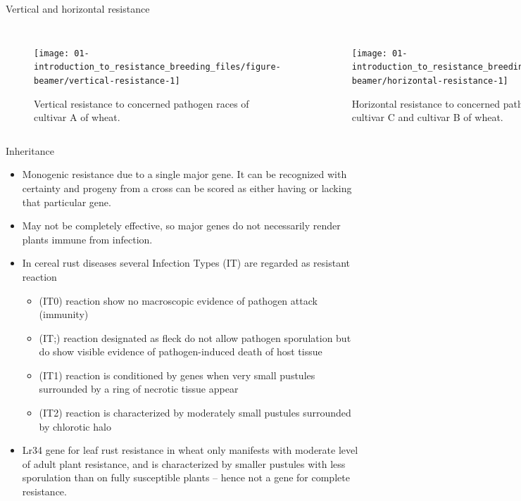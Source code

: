 \documentclass[11pt,dvipsnames,ignorenonframetext,aspectratio=169]{beamer}
\providecommand{\tightlist}{%
  \setlength{\itemsep}{0pt}\setlength{\parskip}{0pt}}
\begin{document}
\begin{frame}{Vertical and horizontal resistance}
\protect\hypertarget{vertical-and-horizontal-resistance}{}
\begin{columns}[T, onlytextwidth]

\begin{figure}
\texttt{[image: 01-introduction\_to\_resistance\_breeding\_files/figure-beamer/vertical-resistance-1]} \caption{Vertical resistance to concerned pathogen races of cultivar A of wheat.}\label{fig:vertical-resistance}
\end{figure}


\begin{figure}
\texttt{[image: 01-introduction\_to\_resistance\_breeding\_files/figure-beamer/horizontal-resistance-1]} \caption{Horizontal resistance to concerned pathogen races of cultivar C and cultivar B of wheat.}\label{fig:horizontal-resistance}
\end{figure}

\end{columns}
\end{frame}

\begin{frame}{Inheritance}
\protect\hypertarget{inheritance}{}
\small

\begin{itemize}
\tightlist
\item
  \alert{Monogenic} resistance due to a single major gene. It can be
  recognized with certainty and progeny from a cross can be scored as
  either having or lacking that particular gene.
\item
  May not be completely effective, so major genes do not necessarily
  render plants immune from infection.
\item
  In cereal rust diseases several Infection Types (IT) are regarded as
  resistant reaction

  \begin{itemize}
  \tightlist
  \item
    (IT0) reaction show no macroscopic evidence of pathogen attack
    (immunity)
  \item
    (IT;) reaction designated as fleck do not allow pathogen sporulation
    but do show visible evidence of pathogen-induced death of host
    tissue
  \item
    (IT1) reaction is conditioned by genes when very small pustules
    surrounded by a ring of necrotic tissue appear
  \item
    (IT2) reaction is characterized by moderately small pustules
    surrounded by chlorotic halo
  \end{itemize}
\item
  Lr34 gene for leaf rust resistance in wheat only manifests with
  moderate level of adult plant resistance, and is characterized by
  smaller pustules with less sporulation than on fully susceptible
  plants -- hence not a gene for complete resistance.
\end{itemize}
\end{frame}
\end{document}
